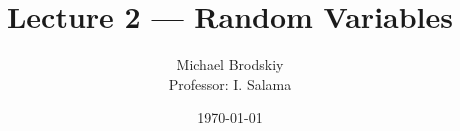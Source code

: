 


\title{Lecture 2 — Random Variables}
\date{\today}
\author{Michael Brodskiy\\ \small Professor: I. Salama}



\maketitle

